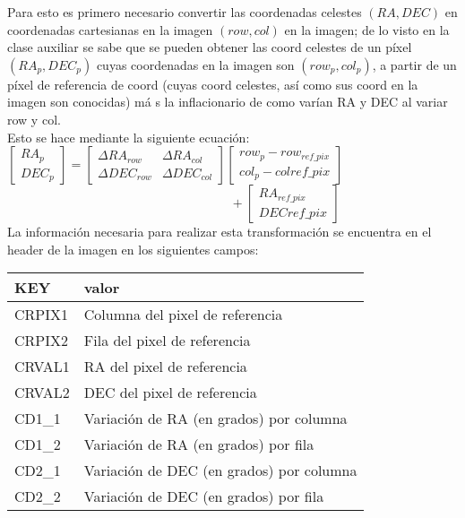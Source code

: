 \documentclass[twocolumn]{AS4201}
\begin{document}
Para esto es primero necesario convertir las coordenadas celestes $(RA,DEC)$ en coordenadas cartesianas en la imagen $(row,col)$ en la imagen; de lo visto en la clase auxiliar se sabe que se pueden obtener las coord celestes de un píxel  $(RA_p,DEC_p)$ cuyas coordenadas en la imagen son $(row_p,col_p)$, a partir de un píxel de referencia de coord (cuyas coord celestes, así como sus coord en la imagen son conocidas) m\'a s la inflacionario de como varían RA y DEC al variar row y col. \\Esto se hace mediante la siguiente ecuación: \\ 
$%
 	\left[\begin{array}{c}
 	    RA_p \\DEC_p 
	\end{array}\right] 
	=
	\left[\begin{array}{cc}
		\Delta RA_{row} & \Delta RA_{col}\\ 
		\Delta DEC_{row} & \Delta DEC_{col}
	\end{array}\right] 
	\left[\begin{array}{c}
 	    row_p-row_{ref\_ pix}\\col_p-col{ref\_ pix}
	\end{array}\right] 		
$
\begin{equation}
\hspace{100pt}
+
	\left[\begin{array}{c}
 	       RA_{ref\_ pix} \\DEC{ref\_ pix}
	\end{array}\right] 
\end{equation}
La información necesaria para realizar esta transformación se encuentra en el header de la imagen en los siguientes campos:
\begin{flushleft}
	\label{table:1}      %
	\begin{tabular}{ll}        %
	KEY & valor\\
	\hline                %
	CRPIX1 & Columna del pixel de referencia\\
	CRPIX2 & Fila del pixel de referencia  \\
	CRVAL1 & RA del pixel de referencia \\
	CRVAL2 & DEC del pixel de referencia \\
	CD1\_1 & Variación de RA (en grados) por columna\\
	CD1\_2 & Variación de RA (en grados) por fila\\
	CD2\_1 & Variación de DEC (en grados) por columna\\
	CD2\_2 & Variación de DEC (en grados) por fila\\
\end{tabular}\end{flushleft}
\end{document}
